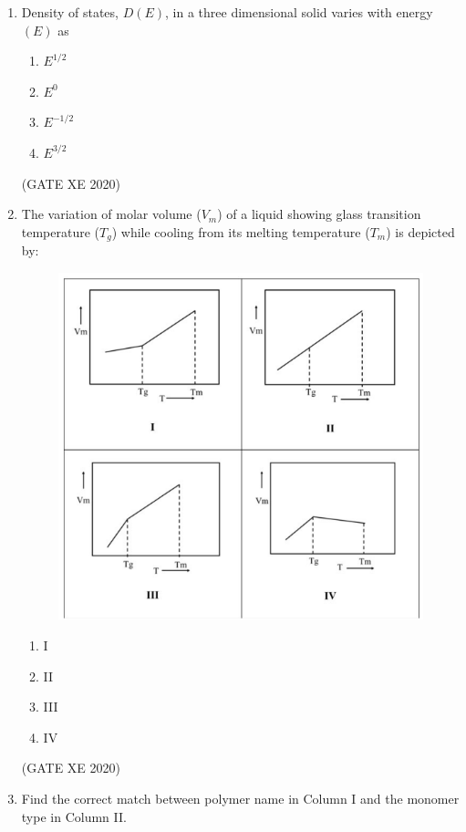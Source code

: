\documentclass[12pt]{article}
\begin{document}
\begin{enumerate}
\item Density of states, $D(E)$, in a three dimensional solid varies with energy $(E)$ as
\begin{enumerate}
    \item $E^{1/2}$
    \item $E^0$
    \item $E^{-1/2}$
    \item $E^{3/2}$
\end{enumerate}
(GATE XE 2020)

\item The variation of molar volume ($V_m$) of a liquid showing glass transition temperature ($T_g$) while cooling from its melting temperature ($T_m$) is depicted by: 

\begin{figure}[H]
    \centering
    \includegraphics[width=0.8\columnwidth]{figs/ass4_c_q5.png}
    \caption{}
    \label{fig:placeholder}
\end{figure}

\begin{enumerate}
\item I  
\item II  
\item III  
\item IV  
\end{enumerate}

(GATE XE 2020)

\item Find the correct match between polymer name in Column I and the monomer type in Column II.  


\end{enumerate}
\end{document}
